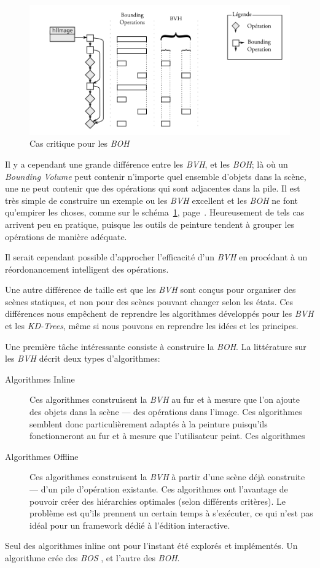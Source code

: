 		\begin{figure}[ht]
			\centering
			\includegraphics[width=\textwidth]{images/bo3} 
			\caption{Cas critique pour les \emph{BOH}}
			\label{fig:bo3}
		\end{figure}
		Il y a cependant une grande différence entre les \emph{BVH}, et les \emph{BOH}; là où un \emph{Bounding Volume}
		peut contenir n'importe quel ensemble
		d'objets dans la scène, une \BO ne peut contenir que des opérations qui sont adjacentes dans la pile. Il
		est très simple de construire un exemple ou les \emph{BVH} excellent et les \emph{BOH} ne font qu'empirer
		les choses, comme sur le schéma~\ref{fig:bo3}, page~\pageref{fig:bo3}. Heureusement de tels cas arrivent peu 
		en pratique, puisque les outils de peinture tendent à grouper les opérations de manière adéquate.

		Il serait cependant possible d'approcher l'efficacité d'un \emph{BVH} en procédant à un réordonancement intelligent
		des opérations. 
		
		Une autre différence de taille est que les \emph{BVH} sont conçus pour organiser des scènes statiques,
		et non pour des scènes pouvant changer selon les états. Ces différences nous empêchent de reprendre 
		les algorithmes développés pour les \emph{BVH} et les \emph{KD-Trees}, 
		même si nous pouvons en reprendre les idées et les principes. 

		Une première tâche intéressante consiste à construire la \emph{BOH}. La littérature\cite{havran} sur les \emph{BVH}
		décrit deux types d'algorithmes:
		\begin{description}
			\item[Algorithmes Inline] Ces algorithmes construisent la \emph{BVH} au fur et à mesure
			que l'on ajoute des objets dans la scène --- des opérations dans l'image. Ces algorithmes 
			semblent donc particulièrement adaptés à la peinture puisqu'ils fonctionneront au fur et à mesure que l'utilisateur
			peint. Ces algorithmes 
			\item[Algorithmes Offline] Ces algorithmes construisent la \emph{BVH} à partir d'une 
			scène déjà construite --- d'un pile d'opération existante. Ces algorithmes ont l'avantage de pouvoir
			créer des hiérarchies optimales (selon différents critères). Le problème est qu'ils prennent un certain temps 
			à s'exécuter, ce qui n'est pas idéal pour un framework dédié à l'édition interactive. 
		\end{description}
		Seul des algorithmes inline ont pour l'instant été explorés et implémentés. Un algorithme crée des \emph{BOS} ,
		et l'autre des \emph{BOH}. 
		

